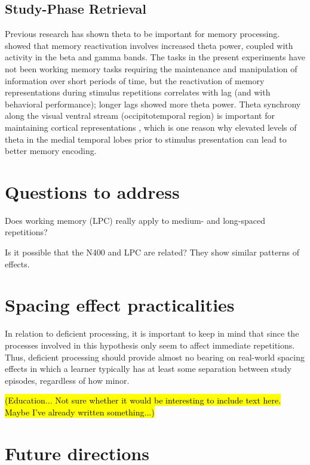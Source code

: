 \subsection{Study-Phase Retrieval}


Previous research has shown theta to be important for memory processing.
 showed that memory reactivation involves increased theta power, coupled with activity in the beta and gamma bands.
The tasks in the present experiments have not been working memory tasks requiring the maintenance and manipulation of information over short periods of time, but the reactivation of memory representations during stimulus repetitions correlates with lag (and with behavioral performance); longer lags showed more theta power.
Theta synchrony along the visual ventral stream (occipitotemporal region) is important for maintaining cortical representations \cite{DuzeEtal2010}, which is one reason why elevated levels of theta in the medial temporal lobes prior to stimulus presentation can lead to better memory encoding.


\section{Questions to address}

Does working memory (LPC) really apply to medium- and long-spaced repetitions?

Is it possible that the N400 and LPC are related? They show similar patterns of effects.

\section{Spacing effect practicalities}

In relation to deficient processing, it is important to keep in mind that since the processes involved in this hypothesis only seem to affect immediate repetitions.  Thus, deficient processing should provide almost no bearing on real-world spacing effects in which a learner typically has at least some separation between study episodes, regardless of how minor.

\hl{(Education... Not sure whether it would be interesting to include text here. Maybe I've already written something...)}

\section{Future directions}



